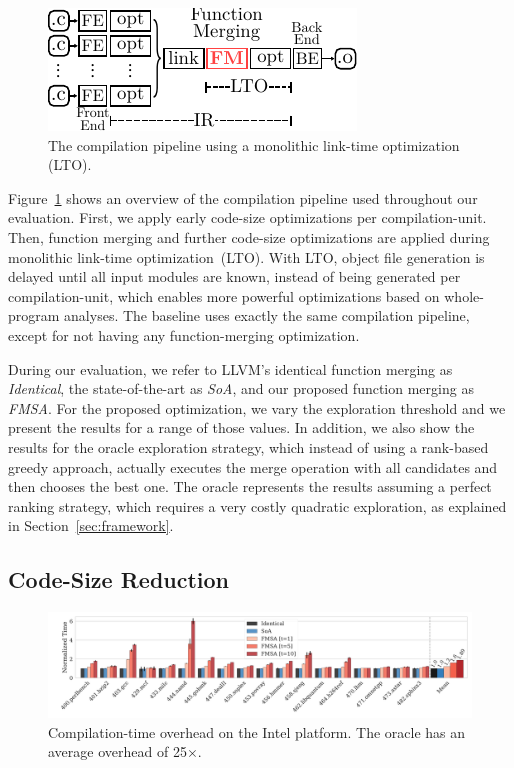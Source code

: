 \begin{figure}[t!]
  \centering
  \includegraphics[width=0.7\linewidth]{figs/opt-pipeline.pdf}
  \caption{The compilation pipeline using a monolithic link-time optimization (LTO).}
  \label{fig:opt-pipeline}
\end{figure}

Figure~\ref{fig:opt-pipeline} shows an overview of the compilation pipeline used
throughout our evaluation.
First, we apply early code-size optimizations per compilation-unit.
Then, function merging and further code-size optimizations are applied during
monolithic link-time optimization~(LTO).
With LTO, object file generation is delayed until all input modules are known,
instead of being generated per compilation-unit, which enables more powerful
optimizations based on whole-program analyses.
The baseline uses exactly the same compilation pipeline, except for not having
any function-merging optimization.

During our evaluation, we refer to LLVM's identical function merging as
\textit{Identical}, the state-of-the-art as \textit{SoA}, and our proposed
function merging as \textit{FMSA}.
For the proposed optimization, we vary the exploration threshold and we present
the results for a range of those values.
In addition, we also show the results for the oracle exploration strategy,
which instead of using a rank-based greedy approach, actually executes the merge operation with all candidates and then chooses the
best one.
The oracle represents the results assuming a perfect ranking strategy, which
requires a very costly quadratic exploration, as explained in
Section~\ref{sec:framework}.


\vspace{-1ex}
\subsection{Code-Size Reduction}

\begin{figure}[t]
  \centering
  \includegraphics[width=\linewidth]{figs/compilation-time.pdf}
  \vspace{-4ex}
  \caption{Compilation-time overhead on the Intel platform. The oracle has an average overhead of 25$\times$.}
  \label{fig:compilation-time}
\end{figure}


